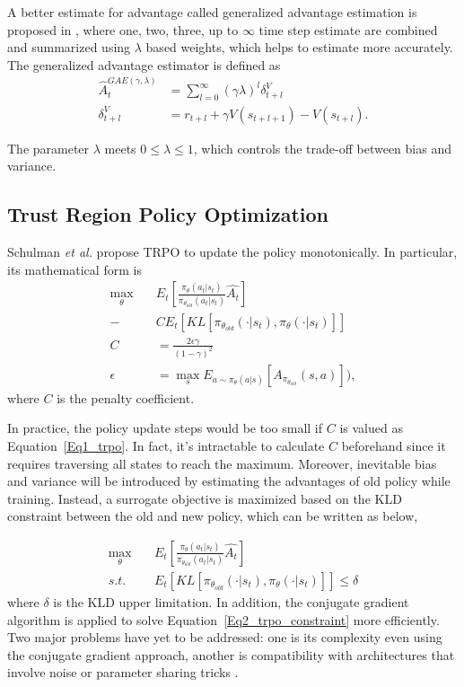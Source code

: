 \documentclass{article}
\begin{document}
A better estimate for advantage called generalized advantage estimation is proposed in \cite{2015arXiv150602438S}, where  one, two, three, up to $\infty$ time step estimate are combined and summarized  using $\lambda$ based weights, which helps to estimate more accurately. The generalized advantage estimator is defined as
\begin{equation}
\begin{split}
\hat{A}_t^{GAE(\gamma,\lambda)} &= \sum_{l=0}^{\infty}(\gamma\lambda)^l\delta_{t+l}^V \\
\delta_{t+l}^V &=r_{t+l} + \gamma V(s_{t+l+1})-V(s_{t+l}). 
\end{split}
\end{equation}

The parameter $\lambda$ meets $0\leq\lambda\leq1$, which controls the trade-off between bias and variance.
\subsection{Trust Region Policy Optimization} \label{TRPO_subsection}
Schulman \textit{et al.} propose TRPO  to  update the policy monotonically. In particular, its mathematical form is \\
\begin{equation}\label{Eq1_trpo}
\begin{split}
\max_\theta \quad  & E_t [ \frac{\pi_\theta(a_t|s_t)}{\pi_{\theta_{old}}(a_t|s_t)} \hat{A_t} ] \\
- &C E_t[KL[\pi_{\theta_{old}}(\cdot|s_t), \pi_\theta(\cdot|s_t)]] \\
C & = \frac{2\epsilon\gamma}{(1-\gamma)^2} \\
\epsilon &= \max_s E_{a\sim\pi_{\theta}(a|s)}[A_{\pi_{\theta_{old}}}(s,a)]), 
\end{split}
\end{equation}
where $C$ is the penalty coefficient. 

In practice, the policy update steps would be too small if $C$ is valued as Equation~\ref{Eq1_trpo}. In fact, it's intractable to calculate $C$  beforehand since it requires traversing all states to reach the maximum. Moreover, inevitable bias and variance will be introduced by estimating the advantages of old policy while training. Instead, a surrogate objective is maximized based on the KLD constraint between the old and new policy, which can be written as below,

\begin{equation}\label{Eq2_trpo_constraint}
\begin{split}
\max_\theta \quad  & E_t [ \frac{\pi_\theta(a_t|s_t)}{\pi_{\theta_{old}}(a_t|s_t)} \hat{A_t} ]\\
s.t.\quad   & E_t[KL[\pi_{\theta_{old}}(\cdot|s_t), \pi_\theta(\cdot|s_t)]] \le \delta 
\end{split}
\end{equation}
where $\delta$ is the KLD upper limitation.  In addition, the conjugate gradient algorithm is applied to solve Equation~\ref{Eq2_trpo_constraint} more efficiently. Two major problems have yet to be addressed: one is its complexity even using the conjugate gradient approach, another is compatibility  with architectures that involve noise or parameter sharing tricks \cite{2017arXiv170706347S}.
\end{document}
